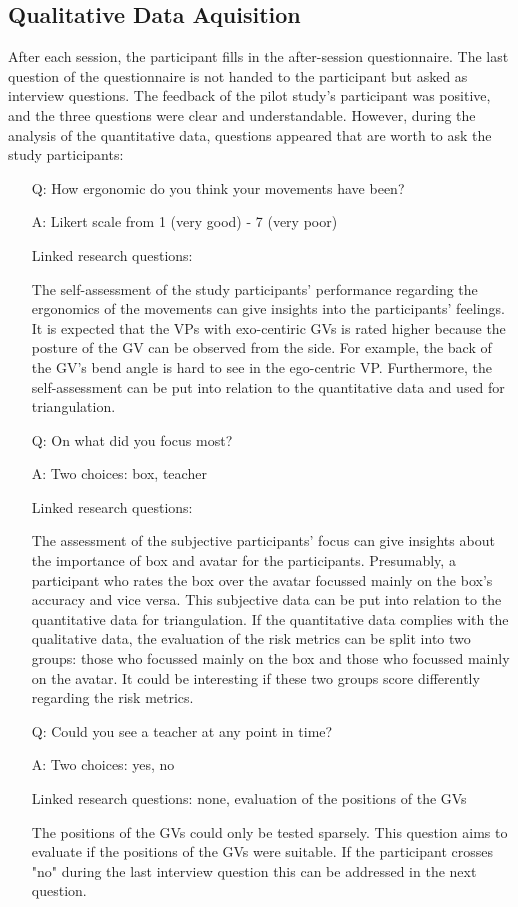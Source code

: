 \subsection{Qualitative Data Aquisition}
After each session, the participant fills in the after-session questionnaire. The last question of the questionnaire is not handed to the participant but asked as interview questions. The feedback of the pilot study's participant was positive, and the three questions were clear and understandable. However, during the analysis of the quantitative data, questions appeared that are worth to ask the study participants:
\begin{itemize}
	\item[Q:] How ergonomic do you think your movements have been?
	\item[A:] Likert scale from 1 (very good) - 7 (very poor)
	\item[] Linked research questions: 
	\item[] The self-assessment of the study participants' performance regarding the ergonomics of the movements can give insights into the participants' feelings. It is expected that the VPs with exo-centiric GVs is rated higher because the posture of the GV can be observed from the side. For example, the back of the GV's bend angle is hard to see in the ego-centric VP. Furthermore, the self-assessment can be put into relation to the quantitative data and used for triangulation.
	\item[Q:] On what did you focus most?
	\item[A:] Two choices: box, teacher
	\item[] Linked research questions: 
	\item[] The assessment of the subjective participants' focus can give insights about the importance of box and avatar for the participants. Presumably, a participant who rates the box over the avatar focussed mainly on the box's accuracy and vice versa. This subjective data can be put into relation to the quantitative data for triangulation. If the quantitative data complies with the qualitative data, the evaluation of the risk metrics can be split into two groups: those who focussed mainly on the box and those who focussed mainly on the avatar. It could be interesting if these two groups score differently regarding the risk metrics.
	\item[Q:] Could you see a teacher at any point in time?
	\item[A:] Two choices: yes, no
	\item[] Linked research questions: none, evaluation of the positions of the GVs
	\item[] The positions of the GVs could only be tested sparsely. This question aims to evaluate if the positions of the GVs were suitable. If the participant crosses "no" during the last interview question this can be addressed in the next question.
\end{itemize}
